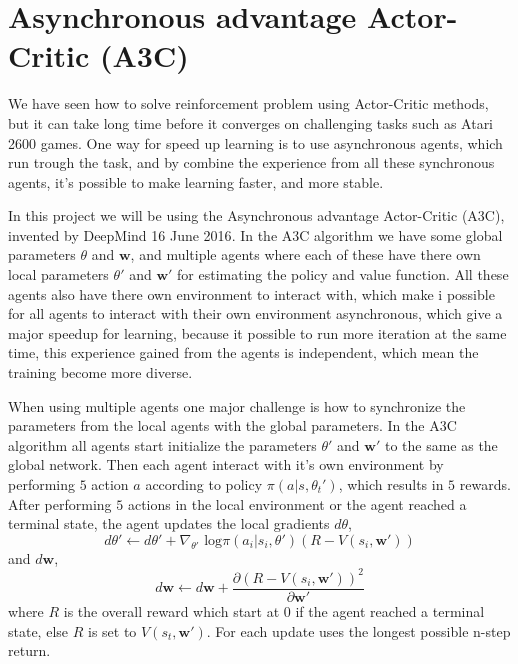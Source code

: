\documentclass[11pt]{article}
\begin{document}
\section{Asynchronous advantage Actor-Critic (A3C)}

We have seen how to solve reinforcement problem using Actor-Critic
methods, but it can take 
long time before it converges on challenging tasks such as
 Atari 2600 games. One way for speed up learning is to use
 asynchronous agents, 
which run trough the task, and by combine the experience from all
these synchronous
 agents, it's possible to make learning faster, and more stable. 

In this project we will be using the Asynchronous advantage
Actor-Critic (A3C), invented by DeepMind 16 June 2016\cite{a3c}. 
In the A3C algorithm we have some global parameters $\theta$ and
$\mathbf{w}$, 
and multiple agents where each of these have there own local
parameters $\theta'$ and $\mathbf{w}'$
 for estimating the policy and value function. All these agents also
 have there own environment to interact with, 
which make i possible for all agents to interact with their own
environment asynchronous, which give a 
major speedup for learning, because it possible to run more iteration
at the same time,
 this experience gained from the agents is independent, which mean the training become more diverse.

When using multiple agents one major challenge is how to synchronize
the parameters from the 
local agents with the global parameters. In the A3C algorithm all
agents start initialize the 
parameters $\theta'$ and $\mathbf{w}'$ to the same as the global
network. Then each agent interact 
with it's own environment by performing $5$ action $a$ according to
policy $\pi (a | s, \theta_{t}')$, which results 
in $5$ rewards. After performing $5$ actions in the local environment
or the agent reached a terminal state, 
the agent updates the local gradients $d\theta$,
\begin{equation}
    d\theta' \leftarrow d\theta' + \nabla_{\theta'} \text{ log} \pi (a_{i} | s_{i}, \theta')(R - V(s_{i}, \mathbf{w}'))
\end{equation}
and $d\mathbf{w}$,
\begin{equation}
    d\mathbf{w} \leftarrow d\mathbf{w} + \frac{\partial (R - V(s_{i}, \mathbf{w}'))^{2}}{\partial \mathbf{w}'}
\end{equation}
where $R$ is the overall reward which start at $0$ if the agent reached a terminal state, else $R$ is set to $V(s_{t}, \mathbf{w}')$. For	each	update uses the	longest	possible	n-step	return.
\end{document}
